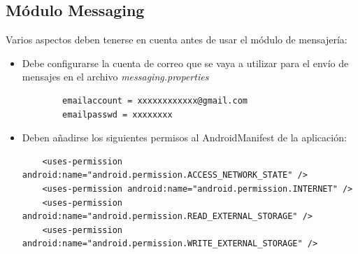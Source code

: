 \subsection{Módulo Messaging}
\label{manual:messaging}
Varios aspectos deben tenerse en cuenta antes de usar el módulo de mensajería:
\begin{itemize}
	\item Debe configurarse la cuenta de correo que se vaya a utilizar para el envío de mensajes en el archivo \textit{messaging.properties}
	\begin{verbatim}
		emailaccount = xxxxxxxxxxxx@gmail.com
		emailpasswd = xxxxxxxx
	\end{verbatim}
	
	\item Deben añadirse los siguientes permisos al AndroidManifest de la aplicación:
	\begin{verbatim}
	<uses-permission android:name="android.permission.ACCESS_NETWORK_STATE" />
	<uses-permission android:name="android.permission.INTERNET" />
	<uses-permission android:name="android.permission.READ_EXTERNAL_STORAGE" />
	<uses-permission android:name="android.permission.WRITE_EXTERNAL_STORAGE" />
	\end{verbatim}
\end{itemize}
\newpage
\thispagestyle{empty}


















